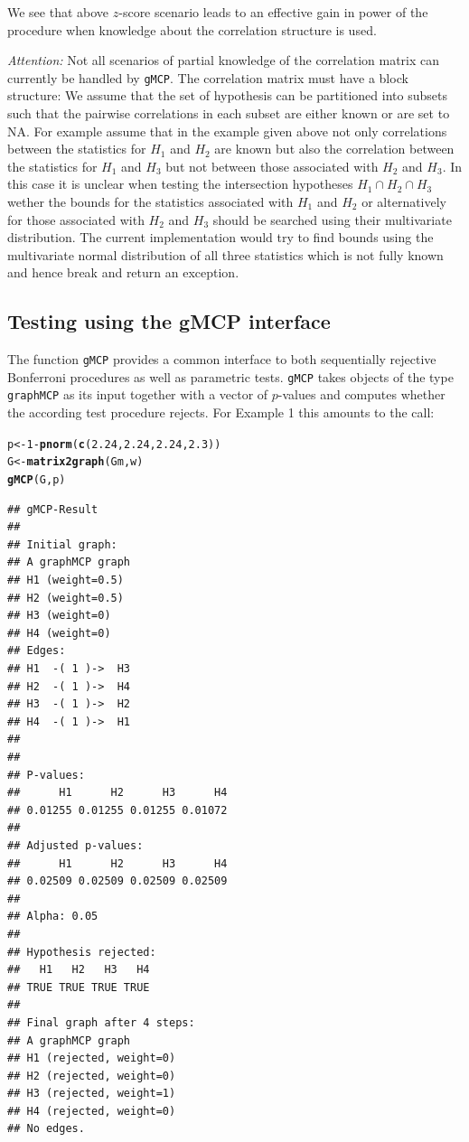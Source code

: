 \documentclass[a4paper, 11pt]{article}\usepackage[]{graphicx}\usepackage[]{color}
\makeatletter
\newcommand{\hlnum}[1]{\textcolor[rgb]{0.686,0.059,0.569}{#1}}%
\newcommand{\hlopt}[1]{\textcolor[rgb]{0,0,0}{#1}}%
\newcommand{\hlstd}[1]{\textcolor[rgb]{0.345,0.345,0.345}{#1}}%
\newcommand{\hlkwb}[1]{\textcolor[rgb]{0.69,0.353,0.396}{#1}}%
\newcommand{\hlkwd}[1]{\textcolor[rgb]{0.737,0.353,0.396}{\textbf{#1}}}%
\newenvironment{kframe}{%
 \def\at@end@of@kframe{}%
 \ifinner\ifhmode%
  \def\at@end@of@kframe{\end{minipage}}%
  \begin{minipage}{\columnwidth}%
 \fi\fi%
 \def\FrameCommand##1{\hskip\@totalleftmargin \hskip-\fboxsep
 \colorbox{shadecolor}{##1}\hskip-\fboxsep
     \hskip-\linewidth \hskip-\@totalleftmargin \hskip\columnwidth}%
 \MakeFramed {\advance\hsize-\width
   \@totalleftmargin\z@ \linewidth\hsize
   \@setminipage}}%
 {\par\unskip\endMakeFramed%
 \at@end@of@kframe}
\newenvironment{knitrout}{}{} %
\newcommand{\gmcp}{\texttt{gMCP}\xspace}
\makeatother
\begin{document}
We see that above $z$-score scenario leads to an effective gain in
power of the procedure when knowledge about the correlation structure
is used.

{\em Attention:} Not all scenarios of partial knowledge of the correlation
matrix can currently be handled by \gmcp. The correlation matrix must
have a block structure: We assume that the set of hypothesis can be
partitioned into subsets such that the pairwise correlations in each
subset are either known or are set to NA.  For
example assume that in the example given above not only correlations
between the statistics for $H_1$ and $H_2$ are known but also the
correlation between the statistics for $H_1$ and $H_3$ but not between
those associated with $H_2$ and $H_3$. In this case it is unclear when
testing the intersection hypotheses $H_1 \cap H_2 \cap H_3$ wether
the bounds for the statistics associated with $H_1$ and $H_2$ or
alternatively for those associated with $H_2$ and $H_3$ should
be searched using their multivariate distribution. The current
implementation would try to find bounds using the multivariate normal
distribution of all three statistics which is not fully known and
hence break and return an exception. 

\subsection{Testing using the gMCP interface}
\label{sec:gmcpint}

The function \gmcp provides a common interface to both sequentially
rejective Bonferroni procedures as well as parametric tests. \gmcp
takes objects of the type \texttt{graphMCP} as its input together with
a vector of $p$-values and computes whether the according test
procedure rejects. For Example 1 this amounts to the call:

\begin{knitrout}
\color{fgcolor}\begin{kframe}
\begin{alltt}
\hlstd{p} \hlkwb{<-} \hlnum{1} \hlopt{-} \hlkwd{pnorm}\hlstd{(}\hlkwd{c}\hlstd{(}\hlnum{2.24}\hlstd{,} \hlnum{2.24}\hlstd{,} \hlnum{2.24}\hlstd{,} \hlnum{2.3}\hlstd{))}
\hlstd{G} \hlkwb{<-} \hlkwd{matrix2graph}\hlstd{(Gm, w)}
\hlkwd{gMCP}\hlstd{(G, p)}
\end{alltt}
\begin{verbatim}
## gMCP-Result
## 
## Initial graph:
## A graphMCP graph
## H1 (weight=0.5)
## H2 (weight=0.5)
## H3 (weight=0)
## H4 (weight=0)
## Edges:
## H1  -( 1 )->  H3 
## H2  -( 1 )->  H4 
## H3  -( 1 )->  H2 
## H4  -( 1 )->  H1 
## 
## 
## P-values:
##      H1      H2      H3      H4 
## 0.01255 0.01255 0.01255 0.01072 
## 
## Adjusted p-values:
##      H1      H2      H3      H4 
## 0.02509 0.02509 0.02509 0.02509 
## 
## Alpha: 0.05 
## 
## Hypothesis rejected:
##   H1   H2   H3   H4 
## TRUE TRUE TRUE TRUE 
## 
## Final graph after 4 steps:
## A graphMCP graph
## H1 (rejected, weight=0)
## H2 (rejected, weight=0)
## H3 (rejected, weight=1)
## H4 (rejected, weight=0)
## No edges.
\end{verbatim}
\end{kframe}
\end{knitrout}
\end{document}
